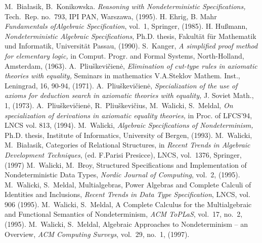 \documentclass[10pt]{article}
\begin{document}
\begin{thebibliography}{MM99}\MyLPar
{} M.~Bia{\l}asik, B.~Konikowska. 
   {\em Reasoning with Nondeterministic Specifications,} Tech.~Rep. no.~793, IPI PAN, Warszawa,
   (1995).
 H. Ehrig, B. Mahr {\em Fundamentals ofAlgebraic Specification},
 vol.~1, Springer, (1985).
 H. Hu{\ss}mann, {\em Nondeterministic Algebraic Specifications},
Ph.D. thesis, Fakult\"{a}t f\"{u}r Mathematik und Informatik, Universit\"{a}t Passau, 
 (1990).
 S.~Kanger,
   {\em A simplified proof method for elementary logic,}
   in Comput. Progr. and Formal Systems, North-Holland, Amsterdam, (1963).
 A.~Pliu\v skevi\v cien\.e, 
   {\em Elimination of cut-type rules in axiomatic theories with equality,}
   Seminars in mathematics V.A.Steklov Mathem. Inst., Leningrad, 16, 90-94, (1971).
 A.~Pliu\v skevi\v cien\.e,
   {\em Specialization of the use of axioms for deduction search in 
   axiomatic theories with equality,}
   J. Soviet Math., 1, (1973).
 A.~Pliu\v skevi\v cien\.e, R.~Pliu\v skevi\v cius,
   M.~Walicki, S.~Meldal,
   {\em On specialization of derivations in axiomatic equality theories,}
   in Proc. of LFCS'94, LNCS vol. 813, (1994).
 M.~Walicki,
   {\em Algebraic Specifications of Nondeterminism,}
   Ph.D. thesis, Institute of Informatics, University of Bergen, (1993).
 M.~Walicki, M.~Bia{\l}asik, Categories of Relational Structures, in
{\em Recent Trends in Algebraic Development Techniques}, (ed. F.Parisi Presicce), 
  LNCS, vol.~1376, Springer, (1997)
 M.~Walicki, M.~Broy, Structured Specifications and Implementation of
   Nondeterministic Data Types, {\em Nordic Journal of Computing}, vol.~2, (1995).
 M.~Walicki, S.~Meldal, 
   Multialgebras, Power Algebras and Complete Calculi of Identities and 
    Inclusions, {\em Recent Trends in Data Type  Specification}, LNCS, vol. 906 (1995).
 M.~Walicki, S.~Meldal, 
 A Complete Calculus for the Multialgebraic and Functional Semantics of Nondeterminism,  
    {\em ACM ToPLaS}, vol.~17, no.~2, (1995).
 M.~Walicki, S.~Meldal, Algebraic Approaches to Nondeterminism --
 an Overview, {\em ACM Computing Surveys}, vol.~29, no.~1, (1997).
\end{thebibliography} 
\end{document}
